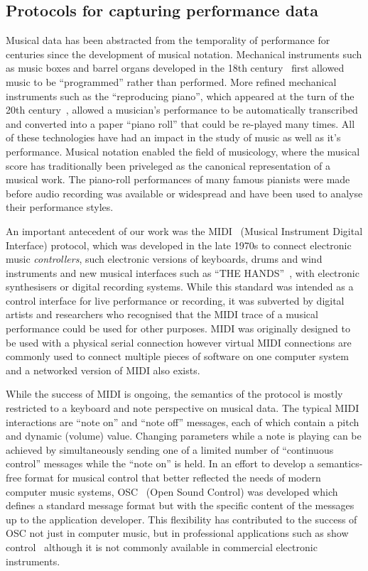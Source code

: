 \documentclass[graybox]{svmult}
\begin{document}
\subsection{Protocols for capturing performance data}
\label{subsec:protocols}

Musical data has been abstracted from the temporality of performance
for centuries since the development of musical notation. Mechanical
instruments such as music boxes and barrel organs developed in the
18th century~\cite{Fowler:1967kq} first allowed music to be
``programmed'' rather than performed. More refined mechanical
instruments such as the ``reproducing piano'', which appeared at the
turn of the 20th century~\cite{Kapur:2005fk}, allowed a musician's performance to be
automatically transcribed and converted into a paper ``piano roll''
that could be re-played many times. All of these technologies have had
an impact in the study of music as well as it's performance. Musical
notation enabled the field of musicology, where the musical score has
traditionally been priveleged as the canonical representation of a
musical work. The piano-roll performances of many famous pianists were
made before audio recording was available or widespread and have been
used to analyse their performance styles.

An important antecedent of our work was the
MIDI~\cite{midi1996complete} (Musical Instrument Digital Interface)
protocol, which was developed in the late 1970s to connect electronic
music \emph{controllers}, such electronic versions of keyboards, drums
and wind instruments and new musical interfaces such as ``THE
HANDS''~\cite{TheHandsArticle}, with electronic synthesisers or
digital recording systems. While this standard was intended as a
control interface for live performance or recording, it was subverted
by digital artists and researchers who recognised that the MIDI trace
of a musical performance could be used for other purposes. MIDI was
originally designed to be used with a physical serial connection
however virtual MIDI connections are commonly used to connect multiple
pieces of software on one computer system and a networked version of
MIDI also exists\cite{Lazzaro:2004pb}.

While the success of MIDI is ongoing, the semantics of the protocol is
mostly restricted to a keyboard and note perspective on musical data.
The typical MIDI interactions are ``note on'' and ``note off''
messages, each of which contain a pitch and dynamic (volume) value.
Changing parameters while a note is playing can be achieved by
simultaneously sending one of a limited number of ``continuous
control'' messages while the ``note on'' is held. In an effort to
develop a semantics-free format for musical control that better
reflected the needs of modern computer music systems,
OSC~\cite{osc-nime2009} (Open Sound Control) was developed which
defines a standard message format but with the specific content of the
messages up to the application developer. This flexibility has
contributed to the success of OSC not just in computer music, but in
professional applications such as show control~\cite{schmeder2010best}
although it is not commonly available in commercial electronic
instruments.
\end{document}
